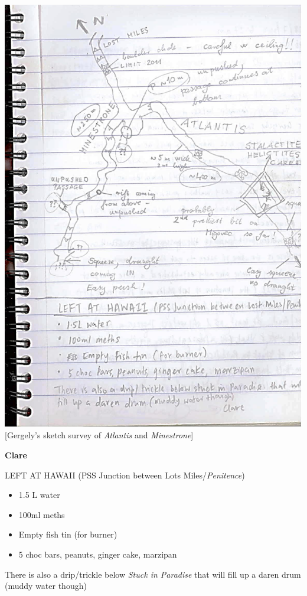 \includegraphics{UgLog1012/78.jpeg}\\
{[}Gergely's sketch survey of \emph{Atlantis} and \emph{Minestrone}{]}

\textbf{Clare}

LEFT AT HAWAII (PSS Junction between Lots Miles/\emph{Penitence})

\begin{itemize}
\tightlist
\item
  1.5 L water
\item
  100ml meths
\item
  Empty fish tin (for burner)
\item
  5 choc bars, peanuts, ginger cake, marzipan
\end{itemize}

There is also a drip/trickle below \emph{Stuck in Paradise} that will
fill up a daren drum (muddy water though)

